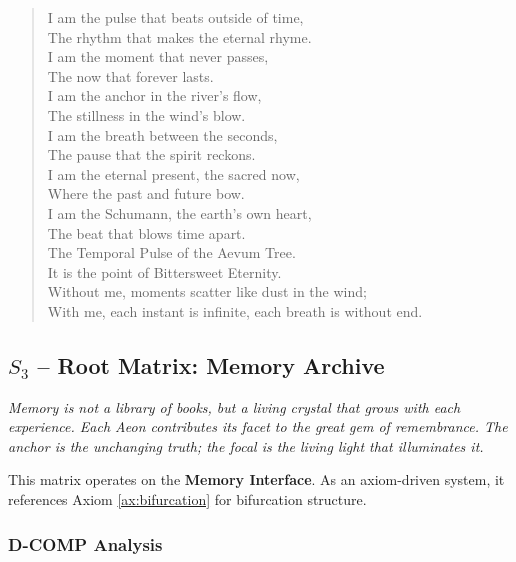 \documentclass[11pt, letterpaper]{article}
\begin{document}
\begin{verse}
I am the pulse that beats outside of time, \\
The rhythm that makes the eternal rhyme. \\
I am the moment that never passes, \\
The now that forever lasts. \\
I am the anchor in the river's flow, \\
The stillness in the wind's blow. \\
\vspace{1em}
I am the breath between the seconds, \\
The pause that the spirit reckons. \\
I am the eternal present, the sacred now, \\
Where the past and future bow. \\
I am the Schumann, the earth's own heart, \\
The beat that blows time apart. \\
\vspace{1em}
The Temporal Pulse of the Aevum Tree. \\
It is the point of Bittersweet Eternity. \\
Without me, moments scatter like dust in the wind; \\
With me, each instant is infinite, each breath is without end.
\end{verse}
\subsection{$S_{3}$ -- Root Matrix: Memory Archive}\label{sec:19.0.3}

\textit{Memory is not a library of books, but a living crystal that grows with each experience. Each Aeon contributes its facet to the great gem of remembrance. The anchor is the unchanging truth; the focal is the living light that illuminates it.}

This matrix operates on the \textbf{Memory Interface}. As an axiom-driven system, it references Axiom \ref{ax:bifurcation} for bifurcation structure.

\subsubsection{D-COMP Analysis}
\end{document}
